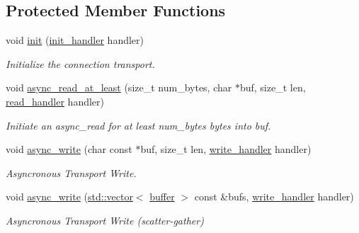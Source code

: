 \subsection*{Protected Member Functions}
\begin{DoxyCompactItemize}
\item 
void \mbox{\hyperlink{classwebsocketpp_1_1transport_1_1stub_1_1connection_ae0cc258a1ca2f1a63ac3706f89bb1bb5}{init}} (\mbox{\hyperlink{namespacewebsocketpp_1_1transport_aeae75e675c1a334b3b33ab7120b480a5}{init\+\_\+handler}} handler)
\begin{DoxyCompactList}\small\item\em Initialize the connection transport. \end{DoxyCompactList}\item 
void \mbox{\hyperlink{classwebsocketpp_1_1transport_1_1stub_1_1connection_a531a99546f52fee1c34c699f9c742348}{async\+\_\+read\+\_\+at\+\_\+least}} (size\+\_\+t num\+\_\+bytes, char $\ast$buf, size\+\_\+t len, \mbox{\hyperlink{namespacewebsocketpp_1_1transport_a3a9b2ed54dfcc6ebe7d7e6b4c02f53fb}{read\+\_\+handler}} handler)
\begin{DoxyCompactList}\small\item\em Initiate an async\+\_\+read for at least num\+\_\+bytes bytes into buf. \end{DoxyCompactList}\item 
void \mbox{\hyperlink{classwebsocketpp_1_1transport_1_1stub_1_1connection_ac2e693adb10e223c76a7e5c00c00f3f2}{async\+\_\+write}} (char const $\ast$buf, size\+\_\+t len, \mbox{\hyperlink{namespacewebsocketpp_1_1transport_addf5d728159e7aa2bce2a0df947b1560}{write\+\_\+handler}} handler)
\begin{DoxyCompactList}\small\item\em Asyncronous Transport Write. \end{DoxyCompactList}\item 
void \mbox{\hyperlink{classwebsocketpp_1_1transport_1_1stub_1_1connection_a471dfa8496b2f131512626b9d8bd273f}{async\+\_\+write}} (\mbox{\hyperlink{classstd_1_1vector}{std\+::vector}}$<$ \mbox{\hyperlink{structwebsocketpp_1_1transport_1_1buffer}{buffer}} $>$ const \&bufs, \mbox{\hyperlink{namespacewebsocketpp_1_1transport_addf5d728159e7aa2bce2a0df947b1560}{write\+\_\+handler}} handler)
\begin{DoxyCompactList}\small\item\em Asyncronous Transport Write (scatter-\/gather) \end{DoxyCompactList}\item 

\end{DoxyCompactItemize}
